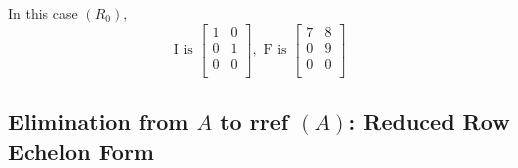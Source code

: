 In this case \((R_0)\),
\[
    \text{I is }
    \begin{bmatrix}
        1 & 0  \\
        0 & 1  \\
        0 & 0  \\
    \end{bmatrix}
    , 
    \text{ F is }
    \begin{bmatrix}
        7 & 8  \\
        0 & 9  \\
        0 & 0  \\
    \end{bmatrix}
\]

\subsection{Elimination from \(A\)  to rref \((A)\): Reduced Row Echelon Form}

